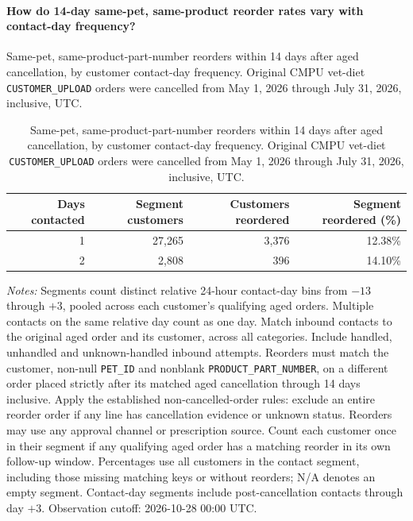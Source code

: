\paragraph{How do 14-day same-pet, same-product reorder rates vary with contact-day frequency?}
Same-pet, same-product-part-number reorders within 14 days after aged cancellation, by customer contact-day frequency. Original CMPU vet-diet \texttt{CUSTOMER\_UPLOAD} orders were cancelled from May 1, 2026 through July 31, 2026, inclusive, UTC.

\begin{table}[!htbp]
\centering
\caption{Same-pet, same-product-part-number reorders within 14 days after aged cancellation, by customer contact-day frequency. Original CMPU vet-diet \texttt{CUSTOMER\_UPLOAD} orders were cancelled from May 1, 2026 through July 31, 2026, inclusive, UTC.}
\label{tab:contact-frequency-same-pet-part-reorders}
\begin{tabular}{@{}rrrr@{}}
\toprule
Days contacted & Segment customers & Customers reordered & Segment reordered (\%) \\
\midrule

1 & 27,265 & 3,376 & 12.38\% \\

2 & 2,808 & 396 & 14.10\% \\
\bottomrule
\end{tabular}

\begin{minipage}{\linewidth}
\footnotesize
\textit{Notes:} Segments count distinct relative 24-hour contact-day bins from
$-13$ through $+3$, pooled across each customer's qualifying aged orders.
Multiple contacts on the same relative day count as one day. Match inbound
contacts to the original aged order and its customer, across all categories.
Include handled, unhandled and unknown-handled inbound attempts. Reorders must match the customer, non-null \texttt{PET\_ID} and nonblank
\texttt{PRODUCT\_PART\_NUMBER}, on a different order placed strictly after
its matched aged cancellation through 14 days inclusive. Apply the established
non-cancelled-order rules: exclude an entire reorder order if any line has
cancellation evidence or unknown status. Reorders may use any approval channel
or prescription source. Count each customer once in their segment if any
qualifying aged order has a matching reorder in its own follow-up window.
Percentages use all customers in the contact segment, including those missing
matching keys or without reorders; N/A denotes an empty segment. Contact-day
segments include post-cancellation contacts through day $+3$.
Observation cutoff: 2026-10-28 00:00 UTC.
\end{minipage}
\end{table}

